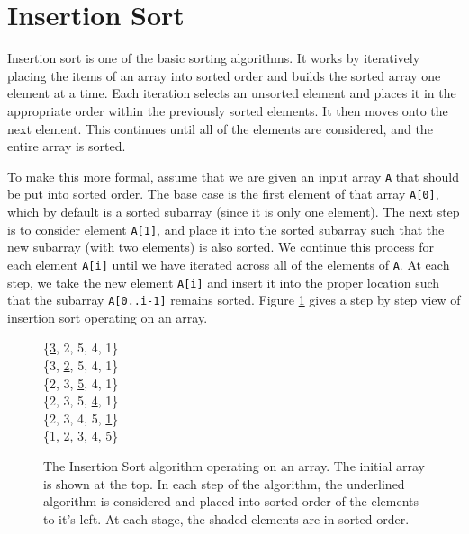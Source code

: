 \section{Insertion Sort}
\label{sec:insertion_sort}

Insertion sort is one of the basic sorting algorithms. It works by iteratively placing the items of an array into sorted order and builds the sorted array one element at a time.  Each iteration selects an unsorted element and places it in the appropriate order within the previously sorted elements. It then moves onto the next element. This continues until all of the elements are considered, and the entire array is sorted.

To make this more formal, assume that we are given an input array \lstinline{A} that should be put into sorted order.  The base case is the first element of that array \lstinline{A[0]}, which by default is a sorted subarray (since it is only one element). The next step is to consider element \lstinline{A[1]}, and place it into the sorted subarray such that the new subarray (with two elements) is also sorted. We continue this process for each element \lstinline{A[i]} until we have iterated across all of the elements of \lstinline{A}. At each step, we take the new element \lstinline{A[i]} and insert it into the proper location such that the subarray \lstinline{A[0..i-1]} remains sorted. Figure \ref{eq:insertion_sort} gives a step by step view of insertion sort operating on an array.
\begin{figure}
\centering
\setlength{\fboxsep}{1pt}
\{\hspace*\fboxsep\underline{3},\hspace*\fboxsep{} 2, 5, 4, 1\} \\
\{\colorbox{black!10}{3,} \underline{2}, 5, 4, 1\} \\
\{\colorbox{black!10}{2, 3,} \underline{5}, 4, 1\} \\
\{\colorbox{black!10}{2, 3, 5,} \underline{4}, 1\} \\
\{\colorbox{black!10}{2, 3, 4, 5,} \underline{1}\} \\
\{\colorbox{black!10}{1, 2, 3, 4, 5}\} \\
\caption{The Insertion Sort algorithm operating on an array.  The initial array is shown at the top.  In each step of the algorithm, the underlined algorithm is considered and placed into sorted order of the elements to it's left. At each stage, the shaded elements are in sorted order. }
\label{eq:insertion_sort}
\end{figure}

